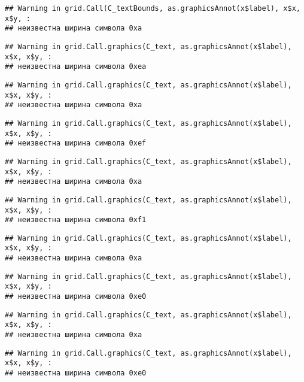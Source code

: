 \documentclass[
]{article}
\begin{document}
\begin{verbatim}
## Warning in grid.Call(C_textBounds, as.graphicsAnnot(x$label), x$x, x$y, :
## неизвестна ширина символа 0xa
\end{verbatim}

\begin{verbatim}
## Warning in grid.Call.graphics(C_text, as.graphicsAnnot(x$label), x$x, x$y, :
## неизвестна ширина символа 0xea
\end{verbatim}

\begin{verbatim}
## Warning in grid.Call.graphics(C_text, as.graphicsAnnot(x$label), x$x, x$y, :
## неизвестна ширина символа 0xa
\end{verbatim}

\begin{verbatim}
## Warning in grid.Call.graphics(C_text, as.graphicsAnnot(x$label), x$x, x$y, :
## неизвестна ширина символа 0xef
\end{verbatim}

\begin{verbatim}
## Warning in grid.Call.graphics(C_text, as.graphicsAnnot(x$label), x$x, x$y, :
## неизвестна ширина символа 0xa
\end{verbatim}

\begin{verbatim}
## Warning in grid.Call.graphics(C_text, as.graphicsAnnot(x$label), x$x, x$y, :
## неизвестна ширина символа 0xf1
\end{verbatim}

\begin{verbatim}
## Warning in grid.Call.graphics(C_text, as.graphicsAnnot(x$label), x$x, x$y, :
## неизвестна ширина символа 0xa
\end{verbatim}

\begin{verbatim}
## Warning in grid.Call.graphics(C_text, as.graphicsAnnot(x$label), x$x, x$y, :
## неизвестна ширина символа 0xe0
\end{verbatim}

\begin{verbatim}
## Warning in grid.Call.graphics(C_text, as.graphicsAnnot(x$label), x$x, x$y, :
## неизвестна ширина символа 0xa
\end{verbatim}

\begin{verbatim}
## Warning in grid.Call.graphics(C_text, as.graphicsAnnot(x$label), x$x, x$y, :
## неизвестна ширина символа 0xe0
\end{verbatim}
\end{document}
